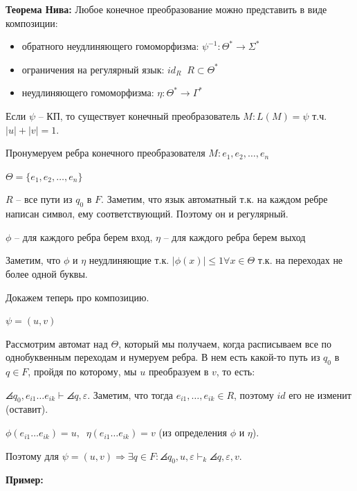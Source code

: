 \EndProof

\textbf{Теорема Нива:} Любое конечное преобразование можно представить в виде композиции: 
\begin{itemize}
    \item обратного неудлиняющего гомоморфизма: $\psi^{-1} : \Theta^* \rightarrow \Sigma^*$
    \item ограничения на регулярный язык: $id_R \;\; R \subset \Theta^*$
    \item неудлиняющего гомоморфизма: $\eta : \Theta^* \rightarrow \Gamma^*$
\end{itemize}

\Proof
Если $\psi$ -- КП, то существует конечный преобразователь $M : L(M) = \psi$ т.ч. $|u| + |v| = 1$.

Пронумеруем ребра конечного преобразователя $M: e_1, e_2, \dots, e_n$

$\Theta = \{e_1, e_2, \dots, e_n\}$

$R$ -- все пути из $q_0$ в $F$. Заметим, что язык автоматный т.к. на каждом ребре написан символ, ему соответствующий. Поэтому он и регулярный.

$\phi$ -- для каждого ребра берем вход, $\eta$ -- для каждого ребра берем выход

Заметим, что $\phi$ и $\eta$ неудлиняющие т.к. $|\phi(x)| \leq 1 \forall x \in \Theta$ т.к. на переходах не более одной буквы.

Докажем теперь про композицию.

$\psi = (u, v)$

Рассмотрим автомат над $\Theta$, который мы получаем, когда расписываем все по однобуквенным переходам и нумеруем ребра. В нем есть какой-то путь из $q_0$ в $q \in F$, пройдя по которому, мы $u$ преобразуем в $v$, то есть:

$\angles{q_0, e_{i1} \dots e_{ik}} \vdash \angles{q, \varepsilon}$. Заметим, что тогда $e_{i1}, \dots, e_{ik} \in R$, поэтому $id$ его не изменит (оставит).

$\phi(e_{i1} \dots e_{ik}) = u,\;\; \eta(e_{i1} \dots e_{ik}) = v$ (из определения $\phi$ и $\eta$).

Поэтому для $\psi = (u, v) \Rightarrow \exists q \in F: \angles{q_0, u, \varepsilon} \vdash_k \angles{q, \varepsilon, v}$.
\EndProof

\textbf{Пример:}

